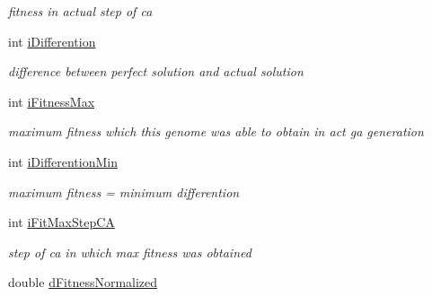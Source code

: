 \begin{DoxyCompactItemize}
\begin{DoxyCompactList}\small\item\em fitness in actual step of ca \item\end{DoxyCompactList}\item 
\hypertarget{classCGenome_aa036ea71601520763f319cbee9ac6d8b}{
int \hyperlink{classCGenome_aa036ea71601520763f319cbee9ac6d8b}{iDifferention}}
\label{classCGenome_aa036ea71601520763f319cbee9ac6d8b}

\begin{DoxyCompactList}\small\item\em difference between perfect solution and actual solution \item\end{DoxyCompactList}\item 
\hypertarget{classCGenome_af87802e7879dda9bf90fca9e6027313d}{
int \hyperlink{classCGenome_af87802e7879dda9bf90fca9e6027313d}{iFitnessMax}}
\label{classCGenome_af87802e7879dda9bf90fca9e6027313d}

\begin{DoxyCompactList}\small\item\em maximum fitness which this genome was able to obtain in act ga generation \item\end{DoxyCompactList}\item 
\hypertarget{classCGenome_ac1a6769e41ac64850d69b6e234d58515}{
int \hyperlink{classCGenome_ac1a6769e41ac64850d69b6e234d58515}{iDifferentionMin}}
\label{classCGenome_ac1a6769e41ac64850d69b6e234d58515}

\begin{DoxyCompactList}\small\item\em maximum fitness = minimum differention \item\end{DoxyCompactList}\item 
\hypertarget{classCGenome_a6acea4c0ed425208f2962c53b2698e08}{
int \hyperlink{classCGenome_a6acea4c0ed425208f2962c53b2698e08}{iFitMaxStepCA}}
\label{classCGenome_a6acea4c0ed425208f2962c53b2698e08}

\begin{DoxyCompactList}\small\item\em step of ca in which max fitness was obtained \item\end{DoxyCompactList}\item 
\hypertarget{classCGenome_a4024efbdde869c1eec9400d97fcb81c7}{
double \hyperlink{classCGenome_a4024efbdde869c1eec9400d97fcb81c7}{dFitnessNormalized}}
\label{classCGenome_a4024efbdde869c1eec9400d97fcb81c7}


\end{DoxyCompactItemize}
